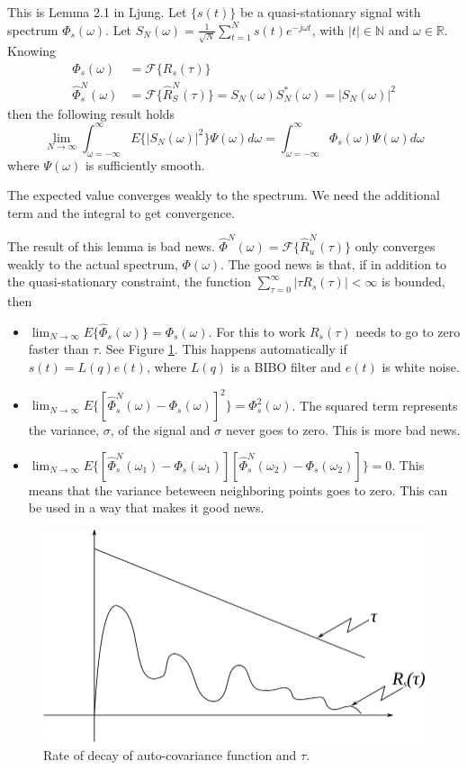 \documentclass[lecture,12pt,]{pcms-l}
\theoremstyle{example}
\newcommand{\fint}{\int_{\omega=-\infty}^\infty}
\newcommand{\w}{\omega}
\begin{document}
\begin{lemma}
This is Lemma 2.1 in Ljung. Let $\{s(t)\}$ be a quasi-stationary signal with spectrum $\Phi_s(\w)$. Let $S_N(\w) = \frac{1}{\sqrt{N}} \sum_{t=1}^N s(t)e^{-j\w t}$, with $|t|\in\mathbb{N}$ and $\w\in\mathbb{R}$. Knowing
\begin{align*}
\Phi_s(\w) &= \mathcal{F}\{R_s(\tau)\} \\
\hat{\Phi}_s^N(\w) &= \mathcal{F}\{\hat{R}_S^N(\tau)\} = S_N(\w)S_N^*(\w) = |S_N(\w)|^2
\end{align*}
then the following result holds
$$\lim_{N\to\infty} \fint E\{|S_N(\w)|^2\}\Psi(\w)d\w = \fint \Phi_s(\w)\Psi(\w)d\w$$
where $\Psi(\w)$ is sufficiently smooth.
\end{lemma}
The expected value converges weakly to the spectrum. We need the additional term and the integral to get convergence.

The result of this lemma is bad news. $\hat{\Phi}^N(\w) = \mathcal{F}\{\hat{R}_u^N(\tau)\}$ only converges weakly to the actual spectrum, $\Phi(\w)$. The good news is that, if in addition to the quasi-stationary constraint, the function $\sum_{\tau=0}^\infty|\tau R_s(\tau)|<\infty$ is bounded, then
\begin{itemize}
\item $\lim_{N\to\infty}E\{\hat{\Phi}_s(\w)\} = \Phi_s(\w)$. For this to work $R_s(\tau)$ needs to go to zero faster than $\tau$. See Figure \ref{fig:06autoCovDecay}. This happens automatically if $s(t)=L(q)e(t)$, where $L(q)$ is a BIBO filter and $e(t)$ is white noise.
\item $\lim_{N\to\infty}E\{[\hat{\Phi}_s^N(\w)-\Phi_s(\w)]^2\} = \Phi_s^2(\w)$. The squared term represents the variance, $\sigma$, of the signal and $\sigma$ never goes to zero. This is more bad news.
\item $\lim_{N\to\infty}E\{[\hat{\Phi}_s^N(\w_1)-\Phi_s(\w_1)][\hat{\Phi}_s^N(\w_2)-\Phi_s(\w_2)]\} = 0$. This means that the variance beteween neighboring points goes to zero. This can be used in a way that makes it good news.
\end{itemize}

\begin{figure}[ht!]
	\centering
	\includegraphics[width=.4\textwidth]{images/06autoCovDecay}
	\caption{Rate of decay of auto-covariance function and $\tau$.}
	\label{fig:06autoCovDecay}
\end{figure}
\end{document}
